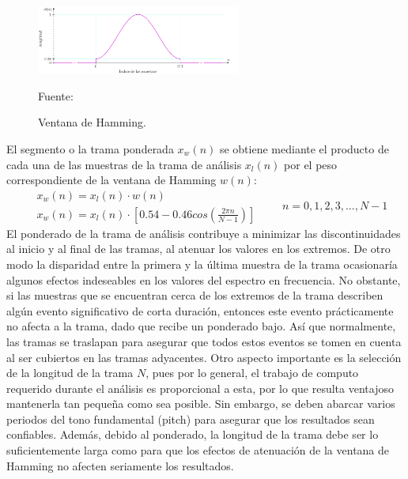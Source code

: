 \begin{enumerate}
\begin{figure}[ht]
\begin{center}
\includegraphics[width=0.6\textwidth]{Imagenes/Cap2/image036}
\end{center}
\begin{center}
\vskip -0.5cm
\caption{\small{Ventana de Hamming.}}
\label{fig:figura2.35}
{\small{Fuente: \cite{eyra}}}
\end{center}
\end{figure}
\vskip -0.5cm
El segmento o la trama ponderada $x_{w}(n)$ se obtiene mediante el producto de cada una de las muestras de la trama de análisis $x_{l}(n)$ por el peso correspondiente de la ventana de Hamming $w(n)$:
\begin{equation}
\label{eq:ecuacion37}
\begin{aligned}
& x_{w}(n) = x_{l}(n) \cdot w(n) \\
& x_{w}(n) = x_{l}(n) \cdot \left [ 0.54 - 0.46cos\left ( \frac{2 \pi n}{N-1} \right ) \right ]
\end{aligned}
\qquad
n = 0,1,2,3,...,N-1
\end{equation}
\vskip 0.5cm
El ponderado de la trama de análisis contribuye a minimizar las discontinuidades al inicio y al final de las tramas, al atenuar los valores en los extremos. De otro modo la disparidad entre la primera y la última muestra de la trama ocasionaría algunos efectos indeseables en los valores del espectro en frecuencia. No obstante, si las muestras que se encuentran cerca de los extremos de la trama describen algún evento significativo de corta duración, entonces este evento prácticamente no afecta a la trama, dado que recibe un ponderado bajo. Así que normalmente, las tramas se traslapan para asegurar que todos estos eventos se tomen en cuenta al ser cubiertos en las tramas adyacentes.
\vskip 0.5cm
Otro aspecto importante es la selección de la longitud de la trama $N$, pues por lo general, el trabajo de computo requerido durante el análisis es proporcional a esta, por lo que resulta ventajoso mantenerla tan pequeña como sea posible. Sin embargo, se deben abarcar varios periodos del tono fundamental (pitch) para asegurar que los resultados sean confiables. Además, debido al ponderado, la longitud de la trama debe ser lo suficientemente larga como para que los efectos de atenuación de la ventana de Hamming no afecten seriamente los resultados. 

\end{enumerate}
